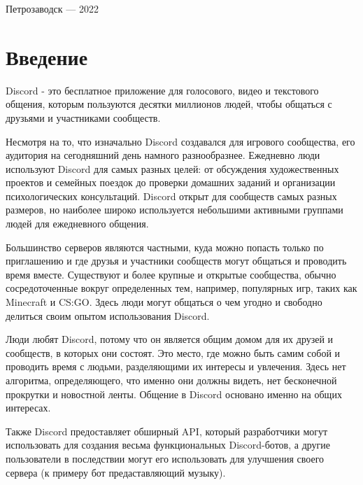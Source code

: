 \documentclass[a4paper,12pt]{article}
\begin{document}
\vfill

\begin{center}
\large
    Петрозаводск --- 2022
\end{center}




\newpage
\tableofcontents

\newpage
\section*{Введение}
\large {

Discord - это бесплатное приложение для голосового, видео и текстового общения, которым пользуются десятки миллионов людей, чтобы общаться с друзьями и участниками сообществ.

Несмотря на то, что изначально Discord создавался для игрового сообщества, его аудитория на сегодняшний день намного разнообразнее. Ежедневно люди используют Discord для самых разных целей: от обсуждения художественных проектов и семейных поездок до проверки домашних заданий и организации психологических консультаций. Discord открыт для сообществ самых разных размеров, но наиболее широко используется небольшими активными группами людей для ежедневного общения.

Большинство серверов являются частными, куда можно попасть только по приглашению и где друзья и участники сообществ могут общаться и проводить время вместе. Существуют и более крупные и открытые сообщества, обычно сосредоточенные вокруг определенных тем, например, популярных игр, таких как Minecraft и CS:GO. Здесь люди могут общаться о чем угодно и свободно делиться своим опытом использования Discord.

Люди любят Discord, потому что он является общим домом для их друзей и сообществ, в которых они состоят. Это место, где можно быть самим собой и проводить время с людьми, разделяющими их интересы и увлечения. Здесь нет алгоритма, определяющего, что именно они должны видеть, нет бесконечной прокрутки и новостной ленты. Общение в Discord основано именно на общих интересах.

Также Discord предоставляет обширный API, который разработчики могут использовать для создания весьма функциональных Discord-ботов, а другие пользователи в последствии могут его использовать для улучшения своего сервера (к примеру бот предаставляющий музыку).} \\ \\
\end{document}
